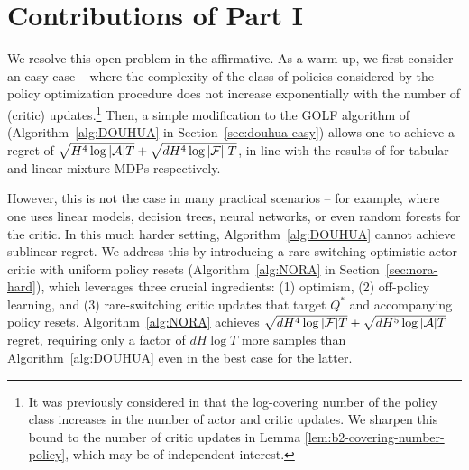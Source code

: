 \section{Contributions of Part I}
We resolve this open problem in the affirmative. As a warm-up, we first consider an easy case -- where the complexity of the class of policies considered by the policy optimization procedure does not increase exponentially with the number of (critic) updates.\footnote{It was previously considered in \citet{zhong2023theoretical} that the log-covering number of the policy class increases in the number of actor and critic updates.  
We sharpen this bound to the number of critic updates in Lemma \ref{lem:b2-covering-number-policy}, which may be of independent interest.} Then, a simple modification to the GOLF algorithm of \citet{jin2021bellmaneluder} (Algorithm~\ref{alg:DOUHUA} in Section~\ref{sec:douhua-easy}) allows one to achieve a regret of $\sqrt{H^4\log|{\mathcal{A}}|T} + \sqrt{dH^4 \log|{\mathcal{F}}| \;T}$,
in line with the results of \citet{efroni2020optimisticpolicyoptimizationbandit, cai2020provably} for tabular and linear mixture MDPs respectively.


However, this is not the case in many practical scenarios -- for example, where one uses linear models, decision trees, neural networks, or even random forests for the critic. In this much harder setting, Algorithm~\ref{alg:DOUHUA} cannot achieve sublinear regret. We address this by introducing a rare-switching optimistic actor-critic with uniform policy resets (Algorithm~\ref{alg:NORA} in Section~\ref{sec:nora-hard}), which leverages three crucial ingredients: (1) optimism, (2) off-policy learning, and (3) rare-switching critic updates that target $Q^*$ and accompanying policy resets. Algorithm~\ref{alg:NORA} achieves $\sqrt{d H^4 \log|{\mathcal{F}}| T} + \sqrt{dH^5 \log|\mathcal{A}|T}$ regret, requiring only a factor of $dH\log T$ more samples than Algorithm~\ref{alg:DOUHUA} even in the best case for the latter.





